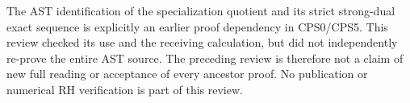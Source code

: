 The AST identification of the specialization quotient and its strict
strong-dual exact sequence is explicitly an earlier proof dependency in
CPS0/CPS5. This review checked its use and the receiving calculation,
but did not independently re-prove the entire AST source. The preceding
review is therefore not a claim of new full reading or acceptance of
every ancestor proof. No publication or numerical RH verification is
part of this review.

